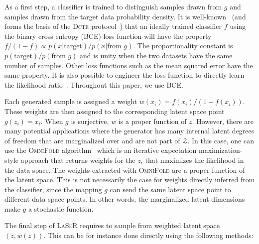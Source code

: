 As a first step, a classifier is trained to distinguish samples drawn from $g$ and samples drawn from the target data probability density. It is well-known~\cite{hastie01statisticallearning,sugiyama_suzuki_kanamori_2012} (and forms the basis of the \textsc{Dctr} protocol~\cite{1907.08209}) that an ideally trained classifier $f$ using the binary cross entropy (BCE) loss function will have the property $f/(1-f)\propto p(x|\text{target})/p(x|\text{from $g$})$. The proportionality constant is $p(\text{target})/p(\text{from $g$})$ and is unity when the two datasets have the same number of samples. Other loss functions such as the mean squared error have the same property. It is also possible to engineer the loss function to directly learn the likelihood ratio~\cite{DAgnolo:2018cun,Nachman:2021yvi}. Throughout this paper, we use BCE.

Each generated sample is assigned a weight $w(x_i)=f(x_i)/(1-f(x_i))$. These weights are then assigned to the corresponding latent space point $g(z_i)=x_i$. When $g$ is surjective, $w$ is a proper function of $z$. However, there are many potential applications where the generator has many internal latent degrees of freedom that are marginalized over and are not part of $\mathcal{Z}$. In this case, one can use the \textsc{OmniFold} algorithm~\cite{Andreassen:2019cjw} which is an iterative expectation maximization-style approach that returns weights for the $z_i$ that maximizes the likelihood in the data space.  The weights extracted with \textsc{OmniFold} are a proper function of the latent space. This is not necessarily the case for weights directly inferred from the classifier, since the mapping $g$ can send the same latent space point to different data space points. In other words, the marginalized latent dimensions make $g$ a stochastic function.


The final step of \textsc{LaSeR} requires to sample from weighted latent space $(z,w(z))$. This can be for instance done directly using the following methods:

